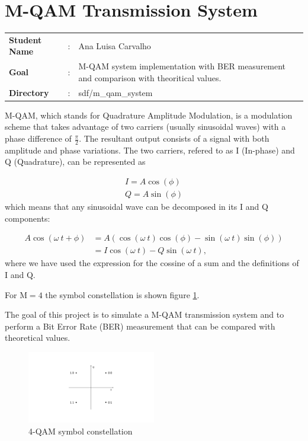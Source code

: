 \clearpage
\section{M-QAM Transmission System}

\begin{tcolorbox}	
	\begin{tabular}{p{2.75cm} p{0.2cm} p{10.5cm}} 	
		\textbf{Student Name}  &:& Ana Luisa Carvalho\\
		\textbf{Goal}          &:& M-QAM system implementation with BER measurement and comparison with theoritical values.\\
		\textbf{Directory} &:& sdf/m\_qam\_system
	\end{tabular}
\end{tcolorbox}

M-QAM, which stands for Quadrature Amplitude Modulation, is a modulation scheme that takes advantage of two carriers (usually sinusoidal waves) with a phase difference of $\frac{\pi}{2}$. The resultant output consists of a signal with both amplitude and phase variations. The two carriers, refered to as I (In-phase) and Q (Quadrature), can be represented as 

\begin{align}
	I=A\cos(\phi) \\
	Q=A\sin(\phi)
\end{align}
which means that any sinusoidal wave can be decomposed in its I and Q components:

\begin{align}
A\cos(\omega~t+\phi)&=A\left(\cos(\omega~t)\cos(\phi)-\sin(\omega~t)\sin(\phi)\right) \\
&=I\cos(\omega~t)-Q\sin(\omega~t),
\end{align} 
where we have used the expression for the cossine of a sum and the definitions of I and Q.

For M$=4$ the symbol constellation is shown figure \ref{fig:const}.

The goal of this project is to simulate a M-QAM transmission system and to perform a Bit Error Rate (BER) measurement that can be compared with theoretical values. 

\begin{figure}[h]
	\centering
	\includegraphics[width=0.5\textwidth]{./figures/MQAM_constellation}
	\caption{4-QAM symbol constellation}
	\label{fig:const}
\end{figure}

